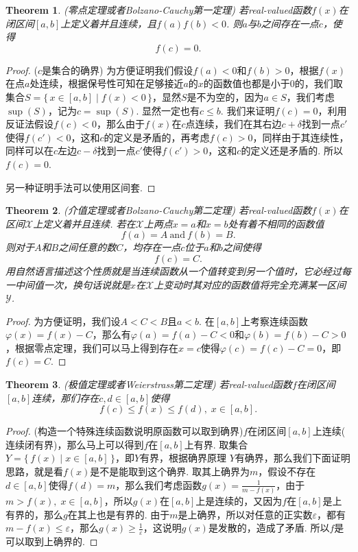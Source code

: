 \documentclass{article}
\newtheorem{theorem}{Theorem}[section]
\newcommand\Set[2]{\{\,#1\mid#2\,\}} %
\begin{document}
\begin{theorem}
\rm {\color{red} (零点定理或者Bolzano-Cauchy第一定理)} 若real-valued函数$f(x)$在闭区间$[a,b]$上定义着并且连续，且$f(a)f(b) < 0$. 则$a$与$b$之间存在一点$c$，使得
$$
f(c) = 0.
$$
\end{theorem}

\begin{proof}
{\color{blue} ($c$是集合的确界) }为方便证明我们假设$f(a) < 0$和$f(b) > 0$，根据$f(x)$在点$a$处连续，根据保号性可知在足够接近$a$的$x$的函数值也都是小于$0$的，我们取集合$S = \Set{x \in [a,b]}{f(x) < 0}$，显然$S$是不为空的，因为$a \in S$，我们考虑$\sup(S)$，记为$c = \sup(S)$. 显然一定也有$c \leq b$. 我们来证明$f(c) = 0$，利用反证法假设$f(c) < 0$，那么由于$f(x)$在$c$点连续，我们在其右边$c+\delta$找到一点$c'$使得$f(c') < 0$，这和$c$的定义是矛盾的，再考虑$f(c) > 0$，同样由于其连续性，同样可以在$c$左边$c-\delta$找到一点$c'$使得$f(c') > 0$，这和$c$的定义还是矛盾的. 所以$f(c) = 0$.

{\color{blue} 另一种证明手法可以使用区间套}.
\end{proof}

\begin{theorem}
\rm {\color{red} (介值定理或者Bolzano-Cauchy第二定理)} 若real-valued函数$f(x)$在区间$\mathcal{X}$上定义着并且连续. 若在$\mathcal{X}$上两点$x=a$和$x=b$处有着不相同的函数值
$$
f(a) = A ~\text{and} ~f(b) = B.
$$
则对于$A$和$B$之间任意的数$C$，均存在一点$c$位于$a$和$b$之间使得
$$
f(c) = C.
$$
用自然语言描述这个性质就是{\color{blue}当连续函数从一个值转变到另一个值时，它必经过每一中间值一次，换句话说就是$x$在$\mathcal{X}$上变动时其对应的函数值将完全充满某一区间$\mathcal{Y}$}.
\end{theorem}

\begin{proof}
为方便证明，我们设$A < C < B$且$a < b$. 在$[a,b]$上考察连续函数$\varphi(x) = f(x) - C$，那么有$\varphi(a) = f(a) - C < 0$和$\varphi(b) = f(b) - C >0$，根据零点定理，我们可以马上得到存在$x=c$使得$\varphi(c) =f(c) - C =0$，即$f(c) = C$.
\end{proof}

\begin{theorem}
\rm {\color{red} (极值定理或者Weierstrass第二定理)} 若real-valued函数$f$在闭区间$[a,b]$连续，那们存在$c,d \in [a,b]$使得
$$
f(c) \leq f(x) \leq f(d),\; x \in [a,b].
$$
\end{theorem}

\begin{proof}
{\color{blue} (构造一个特殊连续函数说明原函数可以取到确界)}$f$在闭区间$[a,b]$上连续({\color{red} 连续闭有界})，那么马上可以得到$f$在$[a,b]$上有界. 取集合$Y = \Set{f(x)}{ x \in [a,b]}$，即$Y$有界，根据{\color{red}确界原理} $Y$有确界，那么我们下面证明思路，就是看$f(x)$是不是能取到这个确界. 取其上确界为$m$，假设不存在$d \in [a,b]$使得$f(d) = m$，那么我们考虑函数$g(x)=\frac{1}{m - f(x)}$，由于$m > f(x),\; x \in [a,b]$，所以$g(x)$在$[a,b]$上是连续的，又因为$f$在$[a,b]$是上有界的，那么$g$在其上也是有界的. 由于$m$是上确界，所以对任意的正实数$\varepsilon$，都有$m - f(x) \leq \varepsilon$，那么$g(x) \geq \frac{1}{\varepsilon}$，这说明$g(x)$是发散的，造成了矛盾. 所以$f$是可以取到上确界的.
\end{proof}
\end{document}
